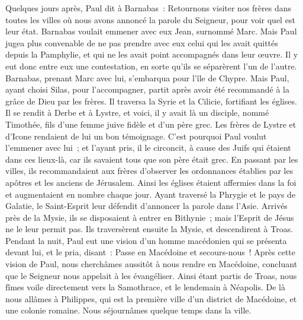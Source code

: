 \begin{multicols}{2}
Quelques jours après, Paul dit à Barnabas~: Retournons visiter nos frères dans toutes les villes où nous avons annoncé la parole du Seigneur, pour voir quel est leur état.
Barnabas voulait emmener avec eux Jean, surnommé Marc.
Mais Paul jugea plus convenable de ne pas prendre avec eux celui qui les avait quittés depuis la Pamphylie, et qui ne les avait point accompagnés dans leur œuvre.
Il y eut donc entre eux une contestation, en sorte qu'ils se séparèrent l'un de l'autre. Barnabas, prenant Marc avec lui, s'embarqua pour l'île de Chypre.
Mais Paul, ayant choisi Silas, pour l'accompagner, partit après avoir été recommandé à la grâce de Dieu par les frères.
Il traversa la Syrie et la Cilicie, fortifiant les églises.
\VerseOne{}Il se rendit à Derbe et à Lystre, et voici, il y avait là un disciple, nommé Timothée, fils d'une femme juive fidèle et d'un père grec.
Les frères de Lystre et d'Icone rendaient de lui un bon témoignage.
C'est pourquoi Paul voulut l'emmener avec lui~; et l'ayant pris, il le circoncit, à cause des Juifs qui étaient dans ces lieux-là, car ils savaient tous que son père était grec.
En passant par les villes, ils recommandaient aux frères d'observer les ordonnances établies par les apôtres et les anciens de Jérusalem.
Ainsi les églises étaient affermies dans la foi et augmentaient en nombre chaque jour.
Ayant traversé la Phrygie et le pays de Galatie, le Saint-Esprit leur défendit d'annoncer la parole dans l'Asie.
Arrivés près de la Mysie, ils se disposaient à entrer en Bithynie~; mais l'Esprit de Jésus ne le leur permit pas.
Ils traversèrent ensuite la Mysie, et descendirent à Troas.
Pendant la nuit, Paul eut une vision d'un homme macédonien qui se présenta devant lui, et le pria, disant~: Passe en Macédoine et secours-nous~!
Après cette vision de Paul, nous cherchâmes aussitôt à nous rendre en Macédoine, concluant que le Seigneur nous appelait à les évangéliser.
Ainsi étant partis de Troas, nous fîmes voile directement vers la Samothrace, et le lendemain à Néapolis.
De là nous allâmes à Philippes, qui est la première ville d'un district de Macédoine, et une colonie romaine. Nous séjournâmes quelque temps dans la ville.

\end{multicols}
